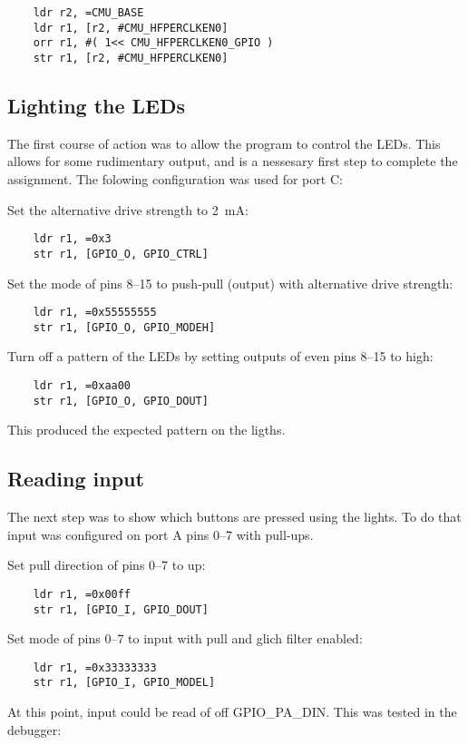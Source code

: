 \begin{verbatim}
    ldr r2, =CMU_BASE
    ldr r1, [r2, #CMU_HFPERCLKEN0]
    orr r1, #( 1<< CMU_HFPERCLKEN0_GPIO )
    str r1, [r2, #CMU_HFPERCLKEN0]
\end{verbatim}


\subsection{Lighting the LEDs}
The first course of action was to allow the program to control the LEDs.
This allows for some rudimentary output, and is a nessesary first step to complete the assignment.
The folowing configuration was used for port C:

Set the alternative drive strength to \SI{2}{\milli\ampere}:
\begin{verbatim}
    ldr r1, =0x3
    str r1, [GPIO_O, GPIO_CTRL]
\end{verbatim}

Set the mode of pins 8--15 to push-pull (output) with alternative drive strength:
\begin{verbatim}
    ldr r1, =0x55555555
    str r1, [GPIO_O, GPIO_MODEH]
\end{verbatim}

Turn off a pattern of the LEDs by setting outputs of even pins 8--15 to high:
\begin{verbatim}
    ldr r1, =0xaa00
    str r1, [GPIO_O, GPIO_DOUT]
\end{verbatim}

This produced the expected pattern on the ligths.


\subsection{Reading input}
The next step was to show which buttons are pressed using the lights.
To do that input was configured on port A pins 0--7 with pull-ups.

Set pull direction of pins 0--7 to up:
\begin{verbatim}
    ldr r1, =0x00ff
    str r1, [GPIO_I, GPIO_DOUT]
\end{verbatim}

Set mode of pins 0--7 to input with pull and glich filter enabled:
\begin{verbatim}
    ldr r1, =0x33333333
    str r1, [GPIO_I, GPIO_MODEL]
\end{verbatim}

At this point, input could be read of off GPIO\_PA\_DIN.
This was tested in the debugger:

